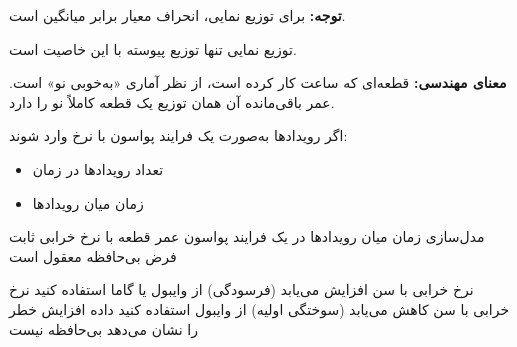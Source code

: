 





\textbf{توجه:} برای توزیع نمایی، انحراف معیار برابر میانگین است.



توزیع نمایی تنها توزیع پیوسته با این خاصیت است.

\textbf{معنای مهندسی:} قطعه‌ای که  ساعت کار کرده است، از نظر آماری «به‌خوبی نو» است. عمر باقی‌مانده آن همان توزیع یک قطعه کاملاً نو را دارد.


اگر رویدادها به‌صورت یک فرایند پواسون با نرخ \lr{$\lambda$} وارد شوند:

\begin{itemize}
\tightlist
\item
  تعداد رویدادها در زمان 
\item
  زمان میان رویدادها 
\end{itemize}


\lr{\mbox{\PSyes{}}} مدل‌سازی زمان میان رویدادها در یک فرایند پواسون\PSbr{}\lr{\mbox{\PSyes{}}} عمر قطعه با نرخ خرابی ثابت\PSbr{}\lr{\mbox{\PSyes{}}} فرض بی‌حافظه معقول است


\lr{\mbox{\PSno{}}} نرخ خرابی با سن افزایش می‌یابد (فرسودگی)  از وایبول یا گاما استفاده کنید\PSbr{}\lr{\mbox{\PSno{}}} نرخ خرابی با سن کاهش می‌یابد (سوختگی اولیه)  از وایبول استفاده کنید\PSbr{}\lr{\mbox{\PSno{}}} داده افزایش خطر را نشان می‌دهد  بی‌حافظه نیست




